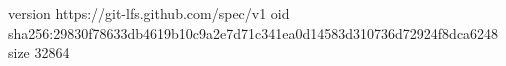 version https://git-lfs.github.com/spec/v1
oid sha256:29830f78633db4619b10c9a2e7d71c341ea0d14583d310736d72924f8dca6248
size 32864
